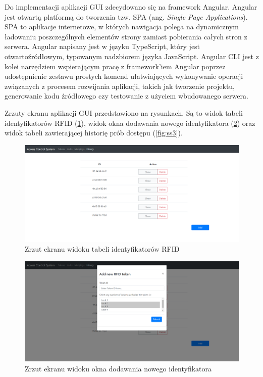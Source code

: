		Do implementacji aplikacji GUI zdecydowano się na framework Angular. Angular jest otwartą platformą do tworzenia tzw. SPA (ang. \textit{Single Page Applications}). SPA to aplikacje internetowe, w których nawigacja polega na dynamicznym ładowaniu poszczególnych elementów strony zamiast pobierania całych stron z serwera. Angular napisany jest w języku TypeScript, który jest otwartoźródłowym, typowanym nadzbiorem języka JavaScript. Angular CLI jest z kolei narzędziem wspierającym pracę z framework'iem Angular poprzez udostępnienie zestawu prostych komend ułatwiających wykonywanie operacji związanych z procesem rozwijania aplikacji, takich jak tworzenie projektu, generowanie kodu źródłowego czy testowanie z użyciem wbudowanego serwera.

		Zrzuty ekranu aplikacji GUI przedstawiono na rysunkach. Są to widok tabeli identyfikatorów RFID (\ref{fig:ss1}), widok okna dodawania nowego identyfikatora (\ref{fig:ss2}) oraz widok tabeli zawierającej historię prób dostępu (\ref{fig:ss3}).

		\begin{figure}[]
            \centering
            \includegraphics[width=\textwidth, frame]{chapters/images/ss1.png}
            \caption{Zrzut ekranu widoku tabeli identyfikatorów RFID}
            \label{fig:ss1}
        \end{figure}

        \begin{figure}[]
            \centering
            \includegraphics[width=\textwidth]{chapters/images/ss2.png}
            \caption{Zrzut ekranu widoku okna dodawania nowego identyfikatora}
            \label{fig:ss2}
        \end{figure}

